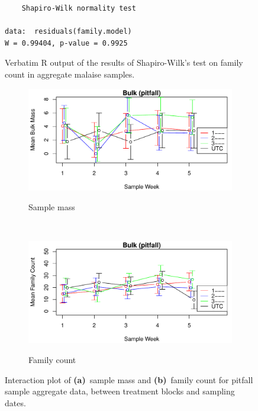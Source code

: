 \documentclass[10pt,letterpaper,twocolumn]{article}
\begin{document}
\begin{figure}[h]
	\lstset{numbers=left}
	\lstset{xleftmargin=5mm,framexleftmargin=5mm}
	\begin{lstlisting}
	Shapiro-Wilk normality test

data:  residuals(family.model)
W = 0.99404, p-value = 0.9925
	\end{lstlisting}
	\caption{Verbatim R output of the results of Shapiro-Wilk's test on family count in aggregate malaise samples.}
	\label{fig:bulk_malaise_family_shapiro}
	\smallskip
	\nointerlineskip
	\hrulefill
\end{figure}

\begin{figure}[h]
	\centering
	\begin{subfigure}[b]{0.45\textwidth}
		\caption{Sample mass}
		\includegraphics[width=\textwidth]{plots/bulk/2015_mass_pitfall_interplot.pdf}
		\label{fig:bulk_pitfall_mass_interplot}
	\end{subfigure}
	~
	\begin{subfigure}[b]{0.45\textwidth}
		\caption{Family count}
		\includegraphics[width=\textwidth]{plots/bulk/2015_family_pitfall_interplot.pdf}
		\label{fig:bulk_pitfall_family_interplot}
	\end{subfigure}
	\caption{Interaction plot of \textbf{(a)}~sample mass and \textbf{(b)}~family count for pitfall sample aggregate data, between treatment blocks and sampling dates.}
	\label{fig:bulk_pitfall_interplot}
	\smallskip
	\nointerlineskip
	\hrulefill
\end{figure}
\end{document}
